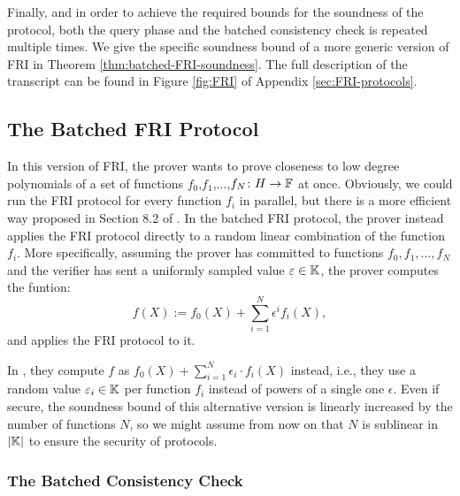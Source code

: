 Finally, and in order to achieve the required bounds for the soundness of the protocol, both the query phase and the batched consistency check is repeated multiple times. We give the specific soundness bound of a more generic version of FRI in Theorem \ref{thm:batched-FRI-soundness}. The full description of the transcript can be found in Figure \ref{fig:FRI} of Appendix \ref{sec:FRI-protocols}.


\subsection*{The Batched FRI Protocol}

In this version of FRI, the prover wants to prove closeness to low degree polynomials of a set of functions $f_0$,$f_1$,$\dots$,$f_N \colon H \to \mathbb{F}$ at once. Obviously, we could run the FRI protocol for every function $f_i$ in parallel, but there is a more efficient way proposed in Section 8.2 of \cite{EPRINT:BCIKS20}. In the batched FRI protocol, the prover instead applies the FRI protocol directly to a random linear combination of the function $f_i$. More specifically, assuming the prover has committed to functions $f_0,f_1,\dots,f_N$ and the verifier has sent a uniformly sampled value $\varepsilon \in \mathbb{K}$, the prover computes the funtion:
\begin{equation}\label{eq:batched-FRI}
f(X) := f_0(X) + \sum_{i=1}^N \epsilon^i f_i(X),
\end{equation}
and applies the FRI protocol to it.

\begin{remark}
  In \cite{EPRINT:BCIKS20}, they compute $f$ as $f_0(X) + \sum_{i=1}^N \epsilon_i \cdot f_i(X)$ instead, i.e., they use a random value $\varepsilon_i \in \mathbb{K}$ per function $f_i$ instead of powers of a single one $\epsilon$. Even if secure, the soundness bound of this alternative version is linearly increased by the number of functions $N$, so we might assume from now on that $N$ is sublinear in $|\mathbb{K}|$ to ensure the security of protocols.
\end{remark}

\subsubsection*{The Batched Consistency Check}

